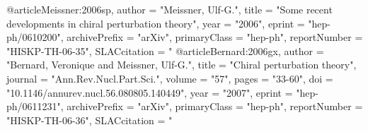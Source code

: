 @article{Meissner:2006sp,
      author         = "Meissner, Ulf-G.",
      title          = "{Some recent developments in chiral perturbation theory}",
      year           = "2006",
      eprint         = "hep-ph/0610200",
      archivePrefix  = "arXiv",
      primaryClass   = "hep-ph",
      reportNumber   = "HISKP-TH-06-35",
      SLACcitation   = "%
}
@article{Bernard:2006gx,
      author         = "Bernard, Veronique and Meissner, Ulf-G.",
      title          = "{Chiral perturbation theory}",
      journal        = "Ann.Rev.Nucl.Part.Sci.",
      volume         = "57",
      pages          = "33-60",
      doi            = "10.1146/annurev.nucl.56.080805.140449",
      year           = "2007",
      eprint         = "hep-ph/0611231",
      archivePrefix  = "arXiv",
      primaryClass   = "hep-ph",
      reportNumber   = "HISKP-TH-06-36",
      SLACcitation   = "%
}


